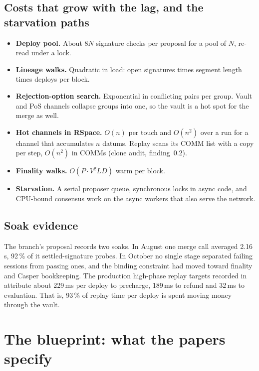\documentclass[11pt]{article}
\newcommand{\code}{\path}
\begin{document}
\subsection{Costs that grow with the lag, and the starvation paths}

\begin{itemize}
\item \textbf{Deploy pool.} About $8N$ signature checks per proposal for a pool of $N$, re-read under a lock.
\item \textbf{Lineage walks.} Quadratic in load: open signatures times segment length times deploys per block.
\item \textbf{Rejection-option search.} Exponential in conflicting pairs per group. Vault and PoS channels collapse groups into one, so the vault is a hot spot for the merge as well.
\item \textbf{Hot channels in RSpace.} $O(n)$ per touch and $O(n^2)$ over a run for a channel that accumulates $n$ datums. Replay scans its COMM list with a copy per step, $O(n^2)$ in COMMs (clone audit, finding~0.2).
\item \textbf{Finality walks.} $O(P \cdot V^2 L D)$ warm per block.
\item \textbf{Starvation.} A serial proposer queue, synchronous locks in async code, and CPU-bound consensus work on the async workers that also serve the network.
\end{itemize}

\subsection{Soak evidence}

The branch's proposal records two soaks. In August one merge call averaged 2.16\,s, 92\,\% of it settled-signature probes. In October no single stage separated failing sessions from passing ones, and the binding constraint had moved toward finality and Casper bookkeeping. The production high-phase replay targets recorded in \code{cost_accounting_perf_spec.rs} attribute about 229\,ms per deploy to precharge, 189\,ms to refund and 32\,ms to evaluation. That is, 93\,\% of replay time per deploy is spent moving money through the vault.

\section{The blueprint: what the papers specify}\label{sec:blueprint}
\end{document}
